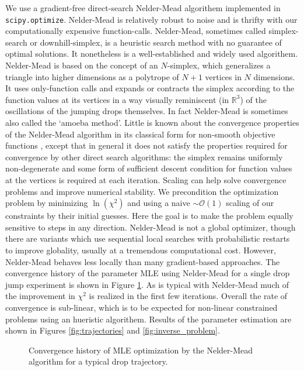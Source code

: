 \documentclass[12pt,a4paper,oneside]{book}
\begin{document}
We use a gradient-free direct-search Nelder-Mead \cite{nelder_simplex_1965} algorithem implemented in \verb|scipy.optimize|. Nelder-Mead is relatively robust to noise and is thrifty with our computationally expensive function-calls. Nelder-Mead, sometimes called simplex-search or downhill-simplex, is a heuristic search method with no guarantee of optimal solutions. It nonetheless is a well-established and widely used algorithem. Nelder-Mead is based on the concept of an $N$-simplex, which generalizes a triangle into higher dimensions as a polytrope of $N + 1$ vertices in $N$ dimensions. It uses only-function calls and expands or contracts the simplex according to the function values at its vertices in a way visually reminiscent (in $\mathbb{R}^3$) of the oscillations of the jumping drops themselves. In fact Nelder-Mead is sometimes also called the `amoeba method'. Little is known about the convergence properties of the Nelder-Mead algorithm in its classical form for non-smooth objective functions \cite{price_convergent_2002}, except that in general it does not satisfy the properties required for convergence by other direct search algorithms: the simplex remains uniformly non-degenerate and some form of sufficient descent condition for function values at the vertices is required at each iteration. Scaling can help solve convergence problems and improve numerical stability. We precondition the optimization problem by minimizing $\ln(\chi^2)$ and using a naive $\sim \mathcal{O}(1)$ scaling of our constraints by their initial guesses. Here the goal is to make the problem equally sensitive to steps in any direction. Nelder-Mead is not a global optimizer, though there are variants which use sequential local searches with probabilistic restarts to improve globality, usually at a tremendous computational cost. However, Nelder-Mead behaves less locally than many gradient-based approaches. The convergence history of the parameter MLE using Nelder-Mead for a single drop jump experiment is shown in Figure \ref{fig:convergence}. As is typical with Nelder-Mead much of the improvement in $\chi^2$ is realized in the first few iterations. Overall the rate of convergence is sub-linear, which is to be expected for non-linear constrained problems using an hueristic algorithem. Results of the parameter estimation are shown in Figures \ref{fig:trajectories} and \ref{fig:inverse_problem}.

\begin{figure}[h]
    \centering
    
    \caption{Convergence history of MLE optimization by the Nelder-Mead algorithm for a typical drop trajectory. \label{fig:convergence}}
\end{figure}
\end{document}
